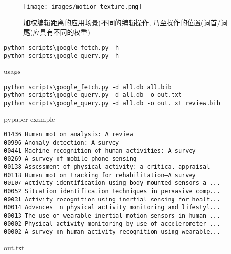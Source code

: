 \documentclass[compress]{beamer}
\begin{document}
\begin{frame}{\insertsubsection}
    \begin{figure}
        \centering
        \texttt{[image: images/motion-texture.png]}
        \caption{加权编辑距离的应用场景(不同的编辑操作, 乃至操作的位置(词首/词尾)应具有不同的权重)}
    \end{figure}
\end{frame}

\begin{frame}[fragile]{\insertsubsection}
    \begin{listing}[H]
        \begin{verbatim}
python scripts\google_fetch.py -h
python scripts\google_query.py -h
        \end{verbatim}
        \caption{usage}
    \end{listing}

    \begin{listing}[H]
        \begin{verbatim}
python scripts\google_fetch.py -d all.db all.bib
python scripts\google_query.py -d all.db -o out.txt
python scripts\google_query.py -d all.db -o out.txt review.bib
        \end{verbatim}
        \caption{pypaper example}
    \end{listing}
\end{frame}

\begin{frame}[fragile]{\insertsubsection}
    \begin{listing}[H]
        \begin{verbatim}
01436 Human motion analysis: A review
00996 Anomaly detection: A survey
00441 Machine recognition of human activities: A survey
00269 A survey of mobile phone sensing
00138 Assessment of physical activity: a critical appraisal
00118 Human motion tracking for rehabilitation—A survey
00107 Activity identification using body-mounted sensors—a ...
00052 Situation identification techniques in pervasive comp...
00031 Activity recognition using inertial sensing for healt...
00014 Advances in physical activity monitoring and lifestyl...
00013 The use of wearable inertial motion sensors in human ...
00002 Physical activity monitoring by use of accelerometer-...
00002 A survey on human activity recognition using wearable...
        \end{verbatim}
        \caption{out.txt}
    \end{listing}
\end{frame}
\end{document}
